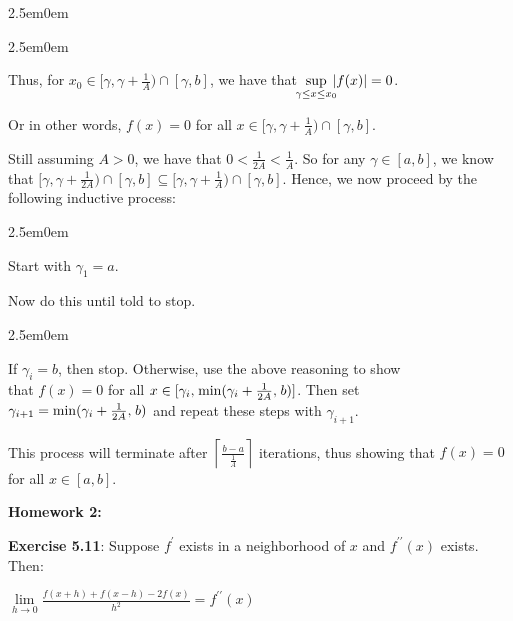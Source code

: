 \documentclass{book}
\newenvironment{myIndent}{%
   \begin{adjustwidth}{2.5em}{0em}%
}{%
   \end{adjustwidth}%
}
\newcommand*{\markHW}[1]{%
   {\huge \color{Black} \textbf{#1} \newline}%
}
\newcommand{\pprime}{{\prime\prime}}
\newcommand{\retTwo}{\hfill\bigbreak}
\begin{document}
{\begin{myIndent}
\begin{myIndent}
      Thus, for $x_0 \in [\gamma, \gamma + \frac{1}{A}) \cap [\gamma, b]$, we have that $\hspace{-0.5em}\sup\limits_{\gamma\leq x\leq x_0}\hspace{-0.5em}|f(x)| = 0$.\retTwo

      Or in other words, $f(x) = 0$ for all $x \in [\gamma, \gamma + \frac{1}{A}) \cap [\gamma, b]$.\retTwo
   \end{myIndent}

   Still assuming $A > 0$, we have that $0 < \frac{1}{2A} < \frac{1}{A}$. So for any $\gamma \in [a, b]$, we know\\ [2pt] that $[\gamma, \gamma + \frac{1}{2A}) \cap [\gamma, b] \subseteq [\gamma, \gamma + \frac{1}{A}) \cap [\gamma, b]$. Hence, we now proceed by the\\ [2pt] following inductive process:

   \begin{myIndent}
      Start with $\gamma_1 = a$.

      Now do this until told to stop.
      \begin{myIndent}
         If $\gamma_i = b$, then stop. Otherwise, use the above reasoning to show\\ that $f(x) = 0$ for all $x \in [\gamma_i,\hspace{0.1em} \min(\gamma_i + \frac{1}{2A},\hspace{0.1em} b)]$. Then set\\ $\gamma_{i+1} = \min(\gamma_i + \frac{1}{2A},\hspace{0.1em} b)$ and repeat these steps with $\gamma_{i+1}$.\retTwo
      \end{myIndent}
   \end{myIndent}

   This process will terminate after $\left\lceil \frac{b - a}{\frac{1}{A}}\right\rceil$ iterations, thus showing that $f(x) = 0$\\ for all $x \in [a, b]$.
   \retTwo
\end{myIndent}}

\newpage

\markHW{Homework 2:}

\textbf{Exercise 5.11}: Suppose $f^\prime$ exists in a neighborhood of $x$ and $f^\pprime(x)$ exists. Then:\\ [-8pt]

{\centering $ \lim\limits_{h \rightarrow 0}\frac{f(x+h) + f(x-h) - 2f(x)}{h^2} = f^\pprime(x)$\retTwo\par}
\end{document}

